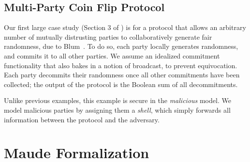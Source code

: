 \documentclass[11pt,hidelinks]{article}
\newcommand{\ret}[1]{\mathsf{ret} \ #1}
\newcommand{\samp}[1]{\mathsf{samp} \ #1}
\begin{document}
%
%
%

\subsection{Multi-Party Coin Flip Protocol}
Our first large case study (Section 3 of \cite{case_studies}) is for a protocol that allows an arbitrary number of mutually distrusting parties to collaboratively generate fair randomness, due to Blum~\cite{blum1983coin}. To do so, each party locally generates randomness, and commits it to all other parties. We assume an idealized commitment functionality that also bakes in a notion of broadcast, to prevent equivocation. Each party decommits their randomness once all other commitments have been collected; the output of the protocol is the Boolean sum of all decommitments.

Unlike previous examples, this example is secure in the \emph{malicious} model. We model malicious parties by assigning them a \emph{shell}, which simply forwards all information between the protocol and the adversary.

\section{Maude Formalization}


 

\end{document}
